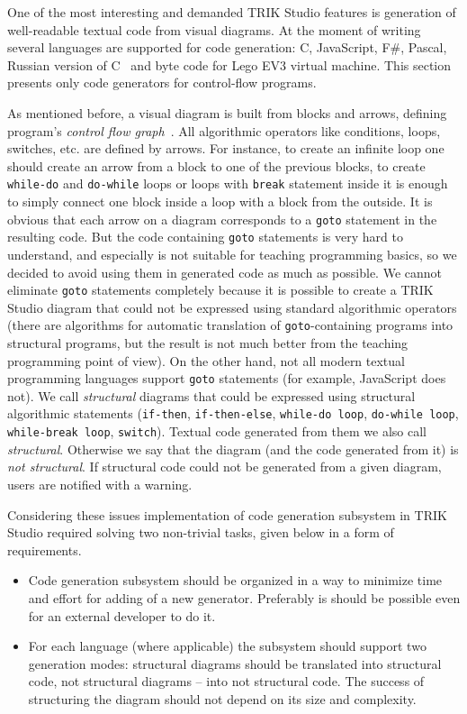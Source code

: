 \documentclass[conference]{IEEEtran}
\begin{document}
One of the most interesting and demanded TRIK Studio features is generation of well-readable textual code from visual diagrams. At the moment of writing several languages are supported for code generation: C, JavaScript, F\#, Pascal, Russian version of C~\cite{тереховотечественные} and byte code for Lego EV3 virtual machine. This section presents only code generators for control-flow programs.

As mentioned before, a visual diagram is built from blocks and arrows, defining program's \textit{control flow graph}~\cite{steven1997advanced}. All algorithmic operators like conditions, loops, switches, etc. are defined by arrows. For instance, to create an infinite loop one should create an arrow from a block to one of the previous blocks, to create \texttt{while-do} and \texttt{do-while} loops or loops with \texttt{break} statement inside it is enough to simply connect one block inside a loop with a block from the outside. It is obvious that each arrow on a diagram corresponds to a \texttt{goto} statement in the resulting code. But the code containing \texttt{goto} statements is very hard to understand, and especially is not suitable for teaching programming basics, so we decided to avoid using them in generated code as much as possible. We cannot eliminate \texttt{goto} statements completely because it is possible to create a TRIK Studio diagram that could not be expressed using standard algorithmic operators (there are algorithms for automatic translation of \texttt{goto}-containing programs into structural programs, but the result is not much better from the teaching programming point of view). On the other hand, not all modern textual programming languages support \texttt{goto} statements (for example, JavaScript does not). We call \textit{structural} diagrams that could be expressed using structural algorithmic statements (\texttt{if-then}, \texttt{if-then-else}, \texttt{while-do loop}, \texttt{do-while loop}, \texttt{while-break loop}, \texttt{switch}). Textual code generated from them we also call \textit{structural}. Otherwise we say that the diagram (and the code generated from it) is \textit{not structural}. If structural code could not be generated from a given diagram, users are notified with a warning.

Considering these issues implementation of code generation subsystem in TRIK Studio required solving two non-trivial tasks, given below in a form of requirements.
 
\begin{itemize}
    \item Code generation subsystem should be organized in a way to minimize time and effort for adding of a new generator. Preferably is should be possible even for an external developer to do it.
    \item For each language (where applicable) the subsystem should support two generation modes: structural diagrams should be translated into structural code, not structural diagrams -- into not structural code. The success of structuring the diagram should not depend on its size and complexity.
\end{itemize}
\end{document}
